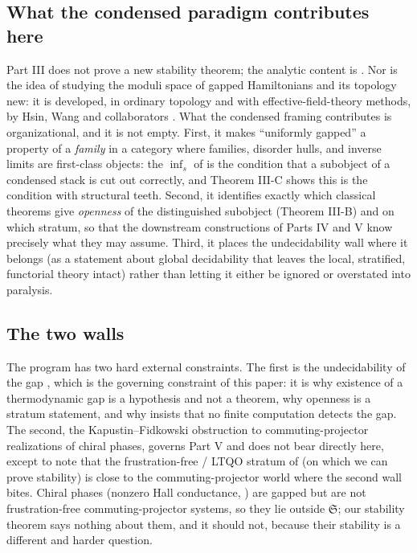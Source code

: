 \documentclass[12pt]{article}
\DeclareMathOperator*{\einf}{inf}
\theoremstyle{plain}
\theoremstyle{definition}
\theoremstyle{remark}
\begin{document}
\subsection{What the condensed paradigm contributes here}
\label{sec:disc-contribute}

Part III does not prove a new stability theorem; the analytic content is
\cite{bhm-stability,bravyi-hastings-shortproof,michalakis-zwolak,nsy-bulkgap,hastings-koma,nachtergaele-sims-clustering}.
Nor is the idea of studying the moduli space of gapped Hamiltonians and its topology
new: it is developed, in ordinary topology and with effective-field-theory methods, by
Hsin, Wang and collaborators \cite{hsin-wang-moduli}. What the condensed framing
contributes is organizational, and it is not empty. First,
it makes ``uniformly gapped'' a property of a \emph{family} in a category where
families, disorder hulls, and inverse limits are first-class objects: the $\einf_s$ of
 is the condition that a subobject of a condensed stack is cut out
correctly, and Theorem III-C shows this is the condition with structural teeth.
Second, it identifies exactly which classical theorems give \emph{openness} of the
distinguished subobject (Theorem III-B) and on which stratum, so that the downstream
constructions of Parts IV and V know precisely what they may assume. Third, it places
the undecidability wall where it belongs (as a statement about global decidability
that leaves the local, stratified, functorial theory intact) rather than letting it
either be ignored or overstated into paralysis.

\subsection{The two walls}
\label{sec:disc-walls}

The program has two hard external constraints. The first is the undecidability of the
gap \cite{cpw-undecidable}, which is the governing constraint of this paper: it is why
existence of a thermodynamic gap is a hypothesis and not a theorem, why openness is a
stratum statement, and why  insists that no finite
computation detects the gap. The second, the Kapustin--Fidkowski obstruction \cite{kapustin-fidkowski} to
commuting-projector realizations of chiral phases, governs Part V
\cite{paperRealizability} and does not bear directly here, except to note that the
frustration-free / LTQO stratum of  (on which we can prove
stability) is close to the commuting-projector world where the second wall bites.
Chiral phases (nonzero Hall conductance, \cite{kapustin-sopenko-noether}) are gapped
but are not frustration-free commuting-projector systems, so they lie outside
$\mathfrak{S}$; our stability theorem says nothing about them, and it should not,
because their stability is a different and harder question.
\end{document}
